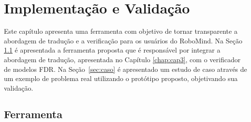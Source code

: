 \chapter{Implementação e Validação} %
\label{chap:cap4}

Este capítulo apresenta uma ferramenta com objetivo de tornar transparente a abordagem de tradução e a verificação para os usuários do RoboMind. Na Seção \ref{sec:tool} é apresentada a ferramenta proposta que é responsável por integrar a abordagem de tradução, apresentada no Capítulo \ref{chap:cap3}, com o verificador de modelos FDR. Na Seção~\ref{sec:caso} é apresentado um estudo de caso através de um exemplo de problema real utilizando o protótipo proposto, objetivando sua validação.

\section{Ferramenta}
\label{sec:tool}
